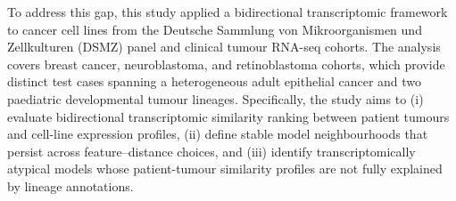 To address this gap, this study applied a bidirectional transcriptomic framework to cancer cell lines from the Deutsche Sammlung von Mikroorganismen und Zellkulturen (DSMZ) panel and clinical tumour RNA-seq cohorts. The analysis covers breast cancer, neuroblastoma, and retinoblastoma cohorts, which provide distinct test cases spanning a heterogeneous adult epithelial cancer and two paediatric developmental tumour lineages. Specifically, the study aims to (i) evaluate bidirectional transcriptomic similarity ranking between patient tumours and cell-line expression profiles, (ii) define stable model neighbourhoods that persist across feature--distance choices, and (iii) identify transcriptomically atypical models whose patient-tumour similarity profiles are not fully explained by lineage annotations.
